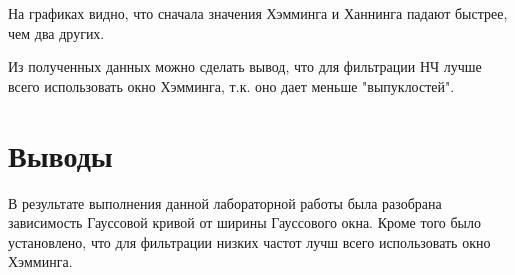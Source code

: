 \documentclass[a4paper, 14pt]{extarticle}
\begin{document}
    На графиках видно, что сначала значения Хэмминга и Ханнинга падают быстрее, чем два других.

    Из полученных данных можно сделать вывод, что для фильтрации НЧ лучше всего использовать окно Хэмминга, т.к. оно дает меньше "выпуклостей".

    \newpage


    \section{Выводы}
    \label{sec:conclusions}

    В результате выполнения данной лабораторной работы была разобрана зависимость Гауссовой кривой от ширины Гауссового окна.
    Кроме того было установлено, что для фильтрации низких частот лучш всего использовать окно Хэмминга.
\end{document}
